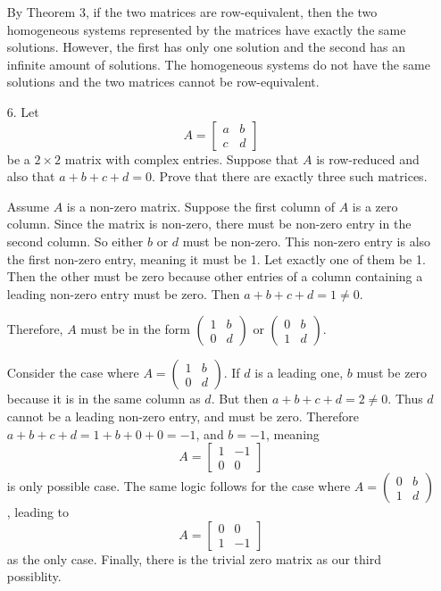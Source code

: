 \documentclass{article}
\begin{document}
\begin{enumerate}[listparindent=\parindent]
By Theorem 3, if the two matrices are row-equivalent,
then the two homogeneous systems represented by the matrices have exactly the same solutions.
However, the first has only one solution and the second has an infinite amount of solutions.
The homogeneous systems do not have the same solutions and the two matrices cannot be row-equivalent.

\item[6.] Let
    \[
        A = \begin{bmatrix}
            a & b \\ c & d
        \end{bmatrix}
    \]
    be a \(2 \times 2\) matrix with complex entries. Suppose that \(A\) is row-reduced and also that \(a + b + c + d = 0\).
    Prove that there are exactly three such matrices.

Assume \(A\) is a non-zero matrix.
Suppose the first column of \(A\) is a zero column.
Since the matrix is non-zero, there must be non-zero entry in the second column. So either \(b\) or \(d\) must be non-zero.
This non-zero entry is also the first non-zero entry, meaning it must be 1. Let exactly one of them be 1.
Then the other must be zero because other entries of a column containing a leading non-zero entry must be zero.
Then \(a + b + c + d = 1 \neq 0\). 

Therefore, \(A\) must be in the form \( (\begin{smallmatrix} 1 & b \\ 0 & d \end{smallmatrix}) \)
or \( (\begin{smallmatrix} 0 & b \\ 1 & d \end{smallmatrix}) \).

Consider the case where \(A = (\begin{smallmatrix} 1 & b \\ 0 & d\end{smallmatrix}) \).
If \(d\) is a leading one, \(b\) must be zero because it is in the same column as \(d\).
But then \(a + b + c + d = 2 \neq 0\).
Thus \(d\) cannot be a leading non-zero entry, and must be zero.
Therefore \(a + b + c + d = 1 + b + 0 + 0 = -1\), and \(b = -1\), meaning
\[
    A = \begin{bmatrix}
        1 & -1 \\ 0 & 0
    \end{bmatrix}
\]
is only possible case. The same logic follows for the case where \(A = (\begin{smallmatrix} 0 & b \\ 1 & d\end{smallmatrix}) \),
leading to 
\[
    A = \begin{bmatrix}
        0 & 0 \\ 1 & -1
    \end{bmatrix}
\]
as the only case. Finally, there is the trivial zero matrix as our third possiblity.


\end{enumerate}
\end{document}
